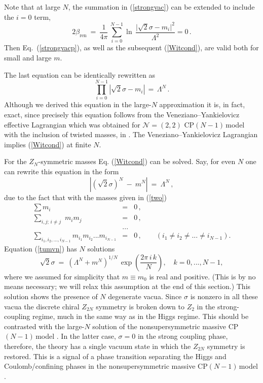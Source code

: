 \documentclass[epsfig,12pt]{article}
\def\beq{\begin{equation}}
\def\eeq{\end{equation}}
\def\beqn{\begin{eqnarray}}
\def\eeqn{\end{eqnarray}}
\newcommand{\cpn}{CP$(N-1)\,$}
\newcommand{\zn}{$Z_N$}
\def\beqn{\begin{eqnarray}}
\def\eeqn{\end{eqnarray}}
\def\beq{\begin{equation}}
\def\eeq{\end{equation}}
\newcommand{\ntwot}{${\mathcal N}= \left(2,2\right) $ }
\newcommand{\bren}{{\beta_\text{ren}}}
\begin{document}
 Note that at large $N$, the summation in (\ref{strongvac}) can be extended to include the
 $i=0$ term,
 \beq
 2\bren~=~\frac{1}{4\pi}\, 
\sum_{i=0}^{N-1}\ln\, {\frac{\bigl|\sqrt{2}\sigma-m_i\bigr|^2}{\Lambda^2}}=0 \,.
\label{strongvacp}
 \eeq
 Then Eq.~(\ref{strongvacp}), as well as 
 the subsequent (\ref{Witcond}), are valid both for small and large $m$.

The last equation can be identically rewritten as 
\beq
\prod_{i=0}^{N-1}\left|\sqrt{2}\sigma-m_i\right| \,=\,\Lambda^N \,.
\label{Witcond}
\eeq
Although we derived this equation in the large-$N$ approximation it is, in fact,
exact, since precisely this equation follows from the
Veneziano--Yankielovicz effective Lagrangian which was obtained for \ntwot \cpn model with the inclusion of twisted masses, 
in  \cite{AdDVecSal,ChVa,W93,HaHo,Dor}. The Veneziano--Yankielovicz  Lagrangian implies (\ref{Witcond})
at finite $N$.

For the \zn-symmetric masses
Eq. (\ref{Witcond}) can be solved. Say, for even $N$ one can rewrite this equation in the form
\beq
\left|\left(\sqrt{2}\sigma\right)^N ~-~ m^N\right| ~=~ \Lambda^N \,,
\label{tumvn}
\eeq
due to the fact that with the masses given in (\ref{two})
\beqn
\sum m_i &=& 0\,,
\nonumber\\[2mm]
\sum_{i,j;\,i\neq j}\,\, m_i m_j &=& 0\,,
\nonumber\\[2mm]
&...&
\nonumber\\[2mm]
\sum_{i_1,i_2,...,i_{N-1}} m_{i_1} m_{i_2} ... m_{i_{N-1}} &=& 0\,,\qquad \left(i_1\neq i_2\neq ...\neq i_{N-1}\right).
\eeqn
Equation (\ref{tumvn})  has $N$ solutions
\beq
\sqrt{2}\sigma ~=~ \left(\Lambda^N+m^N\right)^{1/N}\,
\exp\left( \frac{2\pi\,i\, k}{N}
\right), \quad k=0, ..., N-1,
\label{22sigma}
\eeq
where we assumed for simplicity that $m\equiv m_0$ is real and positive.
(This is by no means necessary; we will relax this assumption at the end of this section.)
This solution shows the presence of $N$ degenerate vacua. Since $\sigma$ is nonzero in all these vacua
the discrete chiral $Z_{2N}$ symmetry is broken down to $Z_2$ in the strong-coupling regime, much in the same way as
in the Higgs regime. This should be contrasted with the large-$N$ solution of the nonsupersymmetric
massive \cpn model \cite{GSYphtr}. In the latter case, $\sigma=0$ in the strong coupling phase, 
therefore, the theory
has   a single vacuum state in which the $Z_{2N}$ symmetry is restored. This is a signal of a phase transition
separating the Higgs and Coulomb/confining phases in the nonsupersymmetric massive \cpn model \cite{GSYphtr}.
\end{document}
